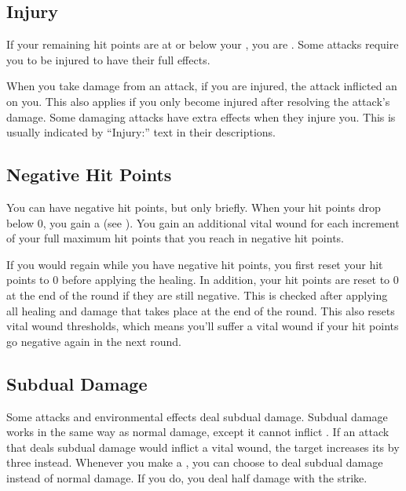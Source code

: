  \subsection{Injury}\label{Injury}
    If your remaining hit points are at or below your , you are .
    Some attacks require you to be injured to have their full effects.

    When you take damage from an attack, if you are injured, the attack inflicted an  on you.
    This also applies if you only become injured after resolving the attack's damage.
    Some damaging attacks have extra effects when they injure you.
    This is usually indicated by ``Injury:'' text in their descriptions.

  \subsection{Negative Hit Points}\label{Negative Hit Points}
    You can have negative hit points, but only briefly.
    When your hit points drop below 0, you gain a  (see ).
    You gain an additional vital wound for each increment of your full maximum hit points that you reach in negative hit points.

    If you would regain  while you have negative hit points, you first reset your hit points to 0 before applying the healing.
    In addition, your hit points are reset to 0 at the end of the round if they are still negative.
    This is checked after applying all healing and damage that takes place at the end of the round.
    This also resets vital wound thresholds, which means you'll suffer a vital wound if your hit points go negative again in the next round.

  \subsection{Subdual Damage}\label{Subdual Damage}
    Some attacks and environmental effects deal subdual damage.
    Subdual damage works in the same way as normal damage, except it cannot inflict .
    If an attack that deals subdual damage would inflict a vital wound, the target increases its  by three instead.
    Whenever you make a , you can choose to deal subdual damage instead of normal damage.
    If you do, you deal half damage with the strike.

